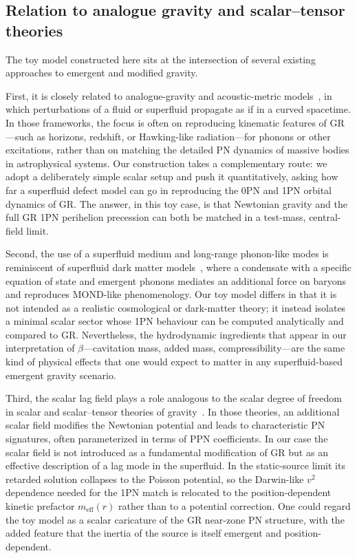 \documentclass[11pt]{article}
\begin{document}
\subsection{Relation to analogue gravity and scalar--tensor theories}
\label{sec:discussion_relation}

The toy model constructed here sits at the intersection of several existing approaches to emergent and modified gravity.

First, it is closely related to analogue-gravity and acoustic-metric models~\cite{Unruh:1980cg,Barcelo:2005fc,Volovik:2003fe}, in which perturbations of a fluid or superfluid propagate as if in a curved spacetime. In those frameworks, the focus is often on reproducing kinematic features of GR---such as horizons, redshift, or Hawking-like radiation---for phonons or other excitations, rather than on matching the detailed PN dynamics of massive bodies in astrophysical systems. Our construction takes a complementary route: we adopt a deliberately simple scalar setup and push it quantitatively, asking how far a superfluid defect model can go in reproducing the 0PN and 1PN orbital dynamics of GR. The answer, in this toy case, is that Newtonian gravity and the full GR 1PN perihelion precession can both be matched in a test-mass, central-field limit.

Second, the use of a superfluid medium and long-range phonon-like modes is reminiscent of superfluid dark matter models~\cite{Berezhiani:2015bqa,Berezhiani:2015pia}, where a condensate with a specific equation of state and emergent phonons mediates an additional force on baryons and reproduces MOND-like phenomenology. Our toy model differs in that it is not intended as a realistic cosmological or dark-matter theory; it instead isolates a minimal scalar sector whose 1PN behaviour can be computed analytically and compared to GR. Nevertheless, the hydrodynamic ingredients that appear in our interpretation of $\beta$---cavitation mass, added mass, compressibility---are the same kind of physical effects that one would expect to matter in any superfluid-based emergent gravity scenario.

Third, the scalar lag field plays a role analogous to the scalar degree of freedom in scalar and scalar--tensor theories of gravity~\cite{Brans:1961sx,Faraoni:2004pi}. In those theories, an additional scalar field modifies the Newtonian potential and leads to characteristic PN signatures, often parameterized in terms of PPN coefficients. In our case the scalar field is not introduced as a fundamental modification of GR but as an effective description of a lag mode in the superfluid. In the static-source limit its retarded solution collapses to the Poisson potential, so the Darwin-like $v^2$ dependence needed for the 1PN match is relocated to the position-dependent kinetic prefactor $m_{\mathrm{eff}}(r)$ rather than to a potential correction. One could regard the toy model as a scalar caricature of the GR near-zone PN structure, with the added feature that the inertia of the source is itself emergent and position-dependent.
\end{document}
